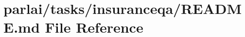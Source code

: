 \hypertarget{parlai_2tasks_2insuranceqa_2README_8md}{}\section{parlai/tasks/insuranceqa/\+R\+E\+A\+D\+ME.md File Reference}
\label{parlai_2tasks_2insuranceqa_2README_8md}
